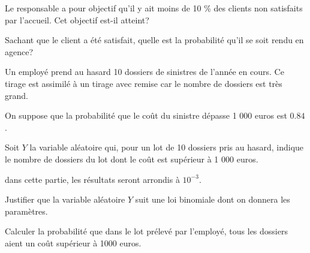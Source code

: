 \documentclass[a4paper,12pt]{scrartcl}
\begin{document}

\question{}
Le responsable a pour objectif qu'il y ait moins de 10 \% des clients non satisfaits par l'accueil. Cet objectif est-il atteint?


\question{}
Sachant que le client a été satisfait, quelle est la probabilité qu'il se soit rendu en agence?


Un employé prend au hasard 10 dossiers de sinistres de l'année en cours. Ce tirage est assimilé à un tirage avec remise car le nombre de dossiers est très grand.

On suppose que la probabilité que le coût du sinistre dépasse 1 000 euros est $0.84$.

Soit $Y$ la variable aléatoire qui, pour un lot de 10 dossiers pris au hasard, indique le nombre de dossiers du lot dont le coût est supérieur à 1 000 euros.

dans cette partie, les résultats seront arrondis à $10^{-3}$.

\question{}
Justifier que la variable aléatoire $Y$ suit une loi binomiale dont on donnera les paramètres.


\question{}
Calculer la probabilité que dans le lot prélevé par l'employé, tous les dossiers aient un coût supérieur à 1000 euros. 

\end{document}
